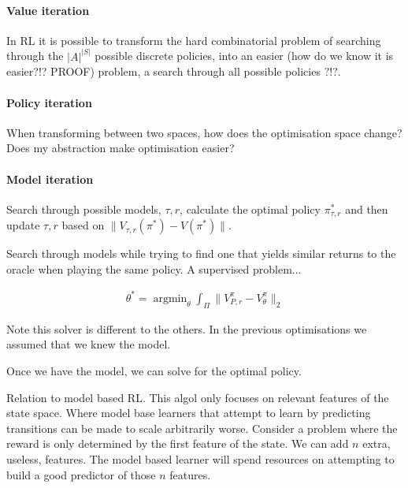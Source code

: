 \paragraph{Value iteration}

In RL it is possible to transform the hard combinatorial problem of
searching through the \(|A|^{|S|}\) possible discrete policies, into an
easier (how do we know it is easier?!? PROOF) problem, a search through
all possible policies \(?!?\).


\paragraph{Policy iteration}

When transforming between two spaces, how does the optimisation space
change? Does my abstraction make optimisation easier?


\paragraph{Model iteration}

Search through possible models, \(\tau, r\), calculate the optimal
policy \(\pi^{* }_{\tau, r}\) and then update \(\tau, r\) based on
\(\parallel V_{\tau, r}(\pi^{* }) - V(\pi^{* }) \parallel\).

Search through models while trying to find one that yields similar returns to the oracle when playing the same policy.
A supervised problem...

\begin{align}
\theta^{* } = \mathop{\text{argmin}}_{\theta} \int_{\Pi} \parallel V^{\pi}_{P, r} -V^{\pi}_{\theta} \parallel_2
\end{align}

Note this solver is different to the others. In the previous optimisations we assumed that we knew the model.


Once we have the model, we can solve for the optimal policy.

Relation to model based RL. This algol only focuses on relevant features of the state space.
Where model base learners that attempt to learn by predicting transitions can be made to scale arbitrarily worse.
Consider a problem where the reward is only determined by the first feature of the state. We can add $n$ extra, useless, features.
The model based learner will spend resources on attempting to build a good predictor of those $n$ features.

